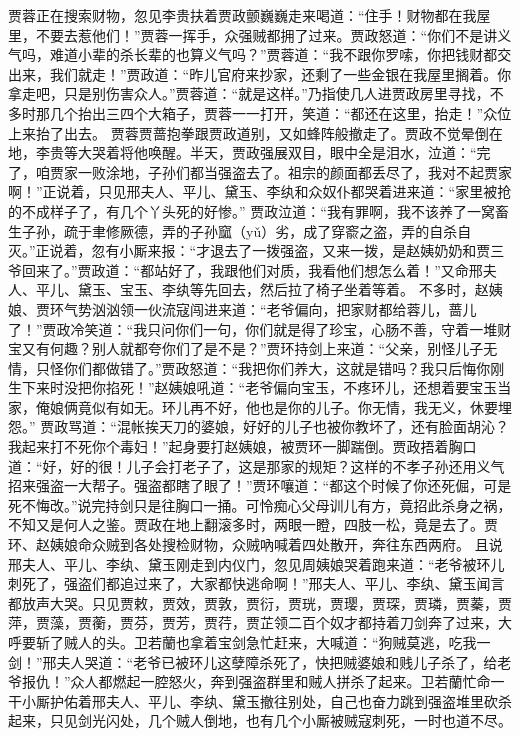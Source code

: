 \documentclass[12pt,oneside]{book}
\begin{document}
贾蓉正在搜索财物，忽见李贵扶着贾政颤巍巍走来喝道：“住手！财物都在我屋里，不要去惹他们！”贾蓉一挥手，众强贼都拥了过来。贾政怒道：“你们不是讲义气吗，难道小辈的杀长辈的也算义气吗？”贾蓉道：“我不跟你罗嗦，你把钱财都交出来，我们就走！”贾政道：“昨儿官府来抄家，还剩了一些金银在我屋里搁着。你拿走吧，只是别伤害众人。”贾蓉道：“就是这样。”乃指使几人进贾政房里寻找，不多时那几个抬出三四个大箱子，贾蓉一一打开，笑道：“都还在这里，抬走！”众位上来抬了出去。
贾蓉贾蔷抱拳跟贾政道别，又如蜂阵般撤走了。贾政不觉晕倒在地，李贵等大哭着将他唤醒。半天，贾政强展双目，眼中全是泪水，泣道：“完了，咱贾家一败涂地，子孙们都当强盗去了。祖宗的颜面都丢尽了，我对不起贾家啊！”正说着，只见邢夫人、平儿、黛玉、李纨和众奴仆都哭着进来道：“家里被抢的不成样子了，有几个丫头死的好惨。”
贾政泣道：“我有罪啊，我不该养了一窝畜生子孙，疏于聿修厥德，弄的子孙窳（yǔ）劣，成了穿窬之盗，弄的自杀自灭。”正说着，忽有小厮来报：“才退去了一拨强盗，又来一拨，是赵姨奶奶和贾三爷回来了。”贾政道：“都站好了，我跟他们对质，我看他们想怎么着！”又命邢夫人、平儿、黛玉、宝玉、李纨等先回去，然后拉了椅子坐着等着。
不多时，赵姨娘、贾环气势汹汹领一伙流寇闯进来道：“老爷偏向，把家财都给蓉儿，蔷儿了！”贾政冷笑道：“我只问你们一句，你们就是得了珍宝，心肠不善，守着一堆财宝又有何趣？别人就都夸你们了是不是？”贾环持剑上来道：“父亲，别怪儿子无情，只怪你们都做错了。”贾政怒道：“我把你们养大，这就是错吗？我只后悔你刚生下来时没把你掐死！”赵姨娘吼道：“老爷偏向宝玉，不疼环儿，还想着要宝玉当家，俺娘俩竟似有如无。环儿再不好，他也是你的儿子。你无情，我无义，休要埋怨。”
贾政骂道：“混帐挨天刀的婆娘，好好的儿子也被你教坏了，还有脸面胡沁？我起来打不死你个毒妇！”起身要打赵姨娘，被贾环一脚踹倒。贾政捂着胸口道：“好，好的很！儿子会打老子了，这是那家的规矩？这样的不孝子孙还用义气招来强盗一大帮子。强盗都瞎了眼了！”贾环嚷道：“都这个时候了你还死倔，可是死不悔改。”说完持剑只是往胸口一捅。可怜痴心父母训儿有方，竟招此杀身之祸，不知又是何人之鉴。贾政在地上翻滚多时，两眼一瞪，四肢一松，竟是去了。贾环、赵姨娘命众贼到各处搜检财物，众贼吶喊着四处散开，奔往东西两府。
且说邢夫人、平儿、李纨、黛玉刚走到内仪门，忽见周姨娘哭着跑来道：“老爷被环儿刺死了，强盗们都追过来了，大家都快逃命啊！”邢夫人、平儿、李纨、黛玉闻言都放声大哭。只见贾敕，贾效，贾敦，贾衍，贾珖，贾璎，贾琛，贾璘，贾蓁，贾萍，贾藻，贾蘅，贾芬，贾芳，贾荇，贾芷领二百个奴才都持着刀剑奔了过来，大呼要斩了贼人的头。卫若蘭也拿着宝剑急忙赶来，大喊道：“狗贼莫逃，吃我一剑！”邢夫人哭道：“老爷已被环儿这孽障杀死了，快把贼婆娘和贱儿子杀了，给老爷报仇！”众人都燃起一腔怒火，奔到强盗群里和贼人拼杀了起来。卫若蘭忙命一干小厮护佑着邢夫人、平儿、李纨、黛玉撤往别处，自己也奋力跳到强盗堆里砍杀起来，只见剑光闪处，几个贼人倒地，也有几个小厮被贼寇刺死，一时也道不尽。
\end{document}
